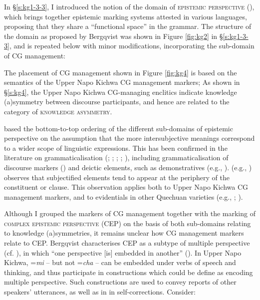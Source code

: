 \documentclass[output=paper]{langscibook}
\begin{document}
In §\ref{s:kg1-3-3}, I introduced the notion of the domain of \textsc{epistemic perspective} (\citealt{Bergqvist2017}), which brings together epistemic marking systems attested in various languages, proposing that they share a “functional space” in the grammar. The structure of the domain as proposed by Bergqvist was shown in Figure \ref{fig:kg2} in §\ref{s:kg1-3-3}‎, and is repeated below with minor modifications, incorporating the sub-domain of CG management:


The placement of CG management shown in Figure \ref{fig:kg4} is based on the semantics of the Upper Napo Kichwa CG management markers; As shown in §‎\ref{s:kg4}, the Upper Napo Kichwa CG-managing enclitics indicate knowledge (a)symmetry between discourse participants, and hence are related to the category of \textsc{knowledge asymmetry}.

\cite{Bergqvist2017} based the bottom-to-top ordering of the different sub-domains of epistemic perspective on the assumption that the more intersubjective meanings correspond to a wider scope of linguistic expressions. This has been confirmed in the literature on grammaticalisation (\citealt{Traugott1995}; \citeyear{Traugott2003}; \citeyear{Traugott2010}; \citeyear{Traugott2012}; \citealt{Traugott2002}), including grammaticalisation of discourse markers (\citealt{Traugott1995}) and deictic elements, such as demonstratives (e.g., \citealt{Kratochvil2011}). \citeauthor{Traugott2010} (e.g., \citeyear{Traugott2010}) observes that subjectified elements tend to appear at the periphery of the constituent or clause. This observation applies both to Upper Napo Kichwa CG management markers, and to evidentials in other Quechuan varieties (e.g., \citealt{Muysken1995}; \citealt{Sanchez2015}).

Although I grouped the markers of CG management together with the marking of \textsc{complex epistemic perspective} (CEP) on the basis of both sub-domains relating to knowledge (a)symmetries, it remains unclear how CG management markers relate to CEP. Bergqvist characterises CEP as a subtype of multiple perspective (cf. \citealt{Evans2005}), in which “one perspective [is] embedded in another” (\citealt[6]{Bergqvist2017}). In Upper Napo Kichwa, =\textit{mi} – but not =\textit{cha} – can be embedded under verbs of speech and thinking, and thus participate in constructions which could be define as encoding multiple perspective. Such constructions are used to convey reports of other speakers’ utterances, as well as in in self-corrections. Consider:
\end{document}
